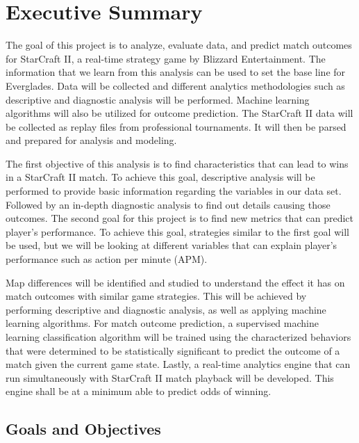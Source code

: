 \documentclass[a4paper,12pt]{report}
\begin{document}

\tableofcontents

\newpage

\setlength{\parskip}{\baselineskip}
\setlength{\parindent}{0in}

\chapter{Executive Summary}

The goal of this project is to analyze, evaluate data, and predict match outcomes for StarCraft II, a real-time strategy game by Blizzard Entertainment. The information that we learn from this analysis can be used to set the base line for Everglades. Data will be collected and different analytics methodologies such as descriptive and diagnostic analysis will be performed. Machine learning algorithms will also be utilized for outcome prediction.
The StarCraft II data will be collected as replay files from professional tournaments. It will then be parsed and prepared for analysis and modeling.

The first objective of this analysis is to find characteristics that can lead to wins in a StarCraft II match.  To achieve this goal, descriptive analysis will be performed to provide basic information regarding the variables in our data set. Followed by an in-depth diagnostic analysis to find out details causing those outcomes. 
The second goal for this project is to find new metrics that can predict player’s performance. To achieve this goal, strategies similar to the first goal will be used, but we will be looking at different variables that can explain player’s performance such as action per minute (APM).

Map differences will be identified and studied to understand the effect it has on match outcomes with similar game strategies. This will be achieved by performing descriptive and diagnostic analysis, as well as applying machine learning algorithms. For match outcome prediction, a supervised machine learning classification algorithm will be trained using the characterized behaviors that were determined to be statistically significant to predict the outcome of a match given the current game state. Lastly, a real-time analytics engine that can run simultaneously with StarCraft II match playback will be developed. This engine shall be at a minimum able to predict odds of winning. 

\section{Goals and Objectives}
\end{document}
